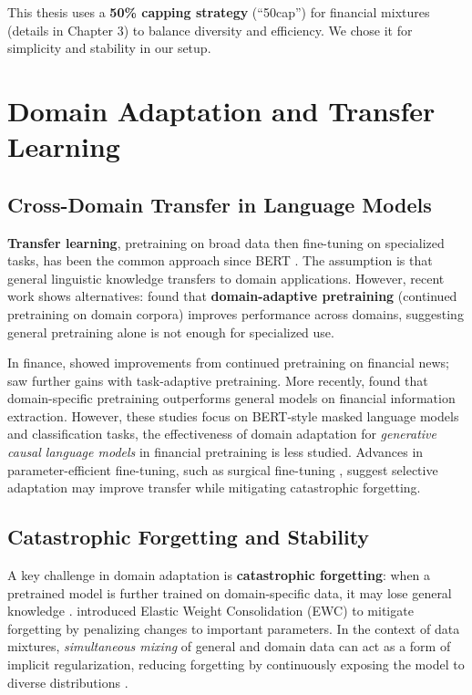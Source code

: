 This thesis uses a \textbf{50\% capping strategy} (``50cap'') for financial mixtures (details in Chapter 3) to balance diversity and efficiency. We chose it for simplicity and stability in our setup.

\section{Domain Adaptation and Transfer Learning}

\subsection{Cross-Domain Transfer in Language Models}

\textbf{Transfer learning}, pretraining on broad data then fine-tuning on specialized tasks, has been the common approach since BERT \parencite{devlin2019bert,pan2010transfer,zhuang2020comprehensive}. The assumption is that general linguistic knowledge transfers to domain applications. However, recent work shows alternatives: \textcite{gururangan2020don} found that \textbf{domain-adaptive pretraining} (continued pretraining on domain corpora) improves performance across domains, suggesting general pretraining alone is not enough for specialized use.

In finance, \textcite{araci2019finbert} showed improvements from continued pretraining on financial news; \textcite{yang2020finbert} saw further gains with task-adaptive pretraining. More recently, \textcite{huang2023finbert} found that domain-specific pretraining outperforms general models on financial information extraction. However, these studies focus on BERT-style masked language models and classification tasks, the effectiveness of domain adaptation for \textit{generative causal language models} in financial pretraining is less studied. Advances in parameter-efficient fine-tuning, such as surgical fine-tuning \parencite{lee2022surgical}, suggest selective adaptation may improve transfer while mitigating catastrophic forgetting.

\subsection{Catastrophic Forgetting and Stability}

A key challenge in domain adaptation is \textbf{catastrophic forgetting}: when a pretrained model is further trained on domain-specific data, it may lose general knowledge \parencite{mccloskey1989catastrophic, french1999catastrophic}. \textcite{kirkpatrick2017overcoming} introduced Elastic Weight Consolidation (EWC) to mitigate forgetting by penalizing changes to important parameters. In the context of data mixtures, \textit{simultaneous mixing} of general and domain data can act as a form of implicit regularization, reducing forgetting by continuously exposing the model to diverse distributions \parencite{arivazhagan2019massively,raffel2020exploring}.


